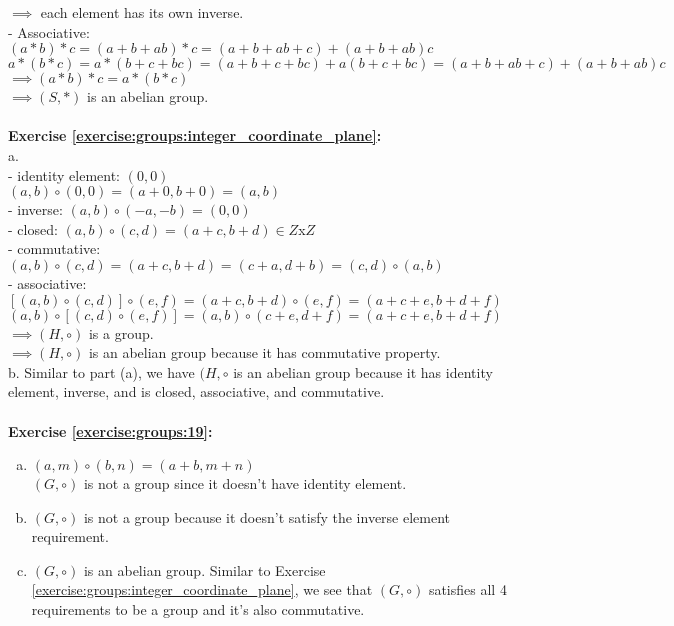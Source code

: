 $\implies$  each element has its own inverse.\\
- Associative:\\
$(a*b)*c=(a+b+ab)*c=(a+b+ab+c)+(a+b+ab)c$\\
$a*(b*c)=a*(b+c+bc)=(a+b+c+bc)+a(b+c+bc)=(a+b+ab+c)+(a+b+ab)c$\\
$\implies (a*b)*c=a*(b*c)$\\
$\implies (S,*)$ is an abelian group.\\
\\
\textbf{Exercise \ref{exercise:groups:integer_coordinate_plane}:}\\
a.\\
- identity element: $(0,0)$\\
$(a,b)\circ (0,0)=(a+0,b+0)=(a,b)$\\
- inverse: $(a,b)\circ (-a,-b)=(0,0)$\\
- closed: $(a,b)\circ (c,d)=(a+c,b+d)\in Z$x$Z$\\
- commutative: $(a,b)\circ (c,d)=(a+c,b+d)=(c+a,d+b)=(c,d)\circ (a,b)$\\
- associative:\\
$[(a,b)\circ (c,d)]\circ (e,f)=(a+c,b+d)\circ (e,f)=(a+c+e,b+d+f)$\\
$(a,b)\circ[(c,d)\circ (e,f)]=(a,b)\circ (c+e,d+f)=(a+c+e,b+d+f)$\\
$\implies (H,\circ)$ is a group.\\
$\implies (H,\circ)$ is an abelian group because it has commutative property.\\
b. Similar to part (a), we have $(H,\circ$ is an abelian group because it has identity element, inverse, and is closed, associative, and commutative.\\
\\
\textbf{Exercise \ref{exercise:groups:19}:}
\begin{enumerate}[(a)]
\item
$(a,m)\circ (b,n)=(a+b,m+n)$\\
$(G,\circ)$ is not a group since it doesn't have identity element.
\item
$(G,\circ)$ is not a group because it doesn't satisfy the inverse element requirement.
\item
$(G,\circ)$ is an abelian group. Similar to Exercise \ref{exercise:groups:integer_coordinate_plane}, we see that $(G,\circ)$ satisfies all 4 requirements to be a group and it's also commutative.
\end{enumerate}
